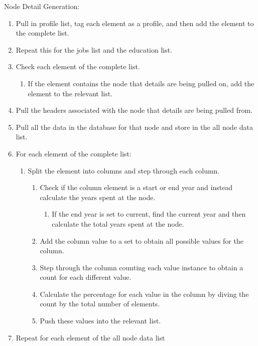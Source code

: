 \begin{description}
    \item[Node Detail Generation:]
\end{description}
\begin{enumerate}
  \item Pull in profile list, tag each element as a profile, and then add
  the element to the complete list.
  \item Repeat this for the jobs list and the education list.
  \item Check each element of the complete list.
  \begin{enumerate}
    \item If the element contains the node that details are being pulled on, add
    the element to the relevant list.
  \end{enumerate}
  \item Pull the headers associated with the node that details are being pulled
  from.
  \item Pull all the data in the database for that node and store in the all
  node data list.
  \item For each element of the complete list:
  \begin{enumerate}
    \item Split the element into columns and step through each column.
    \begin{enumerate}
    	\item Check if the column element is a start or end year and instead
    	calculate the years spent at the node.
    	\begin{enumerate}
    	  \item If the end year is set to current, find the current year and then
    	  calculate the total years spent at the node.
    	\end{enumerate}
    	\item Add the column value to a set to obtain all possible values for
    	the column.
    	\item Step through the column counting each value instance to obtain a
    	count for each different value.
    	\item Calculate the percentage for each value in the column by diving the
    	count by the total number of elements.
    	\item Push these values into the relevant list.
    \end{enumerate} 
  \end{enumerate}
  \item Repeat for each element of the all node data list

\end{enumerate}
